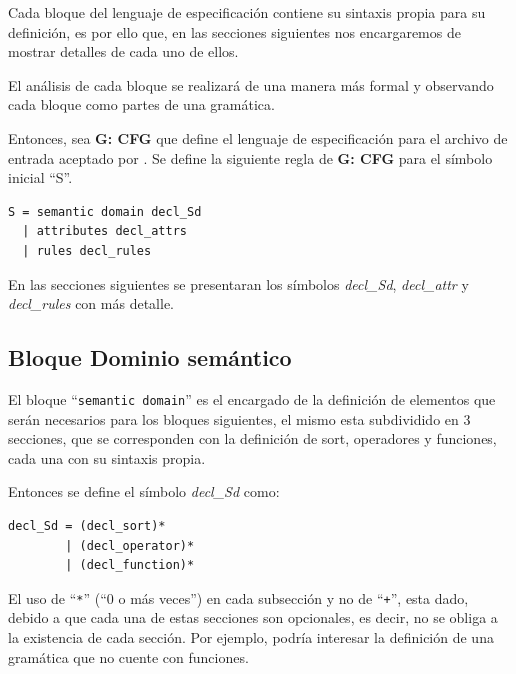 Cada bloque del lenguaje de especificación contiene su sintaxis propia para su definición, es por ello que, en las secciones siguientes nos encargaremos de mostrar detalles de cada uno de ellos.

El análisis de cada bloque se realizará de una manera más formal y observando cada bloque como partes de una gramática.

Entonces, sea \textbf{G: CFG} que define el lenguaje de especificación para el archivo de entrada aceptado por \maggen. Se define la siguiente regla de \textbf{G: CFG} para el símbolo inicial ``S''.

\vspace{0.3cm}
\begin{lstlisting}[frame=shadowbox, rulesepcolor=\color{azul},language=specmag, linewidth=10cm ]
S = semantic domain decl_Sd
  | attributes decl_attrs
  | rules decl_rules
\end{lstlisting}
\vspace{0.3cm}

En las secciones siguientes se presentaran los símbolos \textit{decl\_Sd}, \textit{decl\_attr} y \textit{decl\_rules} con más detalle.  

\subsection{Bloque Dominio semántico}
\label{subsec:bloq-sem}
El bloque ``\texttt{semantic domain}'' es el encargado de la definición de elementos que serán necesarios para los bloques siguientes, el mismo esta subdividido en 3 secciones, que se corresponden con la definición de sort, operadores y funciones, cada una con su sintaxis propia. 

Entonces se define el símbolo \textit{decl\_Sd} como:

\vspace{0.3cm}
\begin{lstlisting}[frame=shadowbox, rulesepcolor=\color{azul},language=inform,linewidth=10cm]
decl_Sd = (decl_sort)*
        | (decl_operator)*
        | (decl_function)*
\end{lstlisting}
\vspace{0.3cm}

El uso de ``\texttt{*}'' (``0 o más veces'') en cada subsección y no de ``\texttt{+}'', esta dado, debido a que cada una de estas secciones son opcionales, es decir, no se obliga a la existencia de cada sección. Por ejemplo, podría interesar la definición de una gramática que no cuente con funciones.

